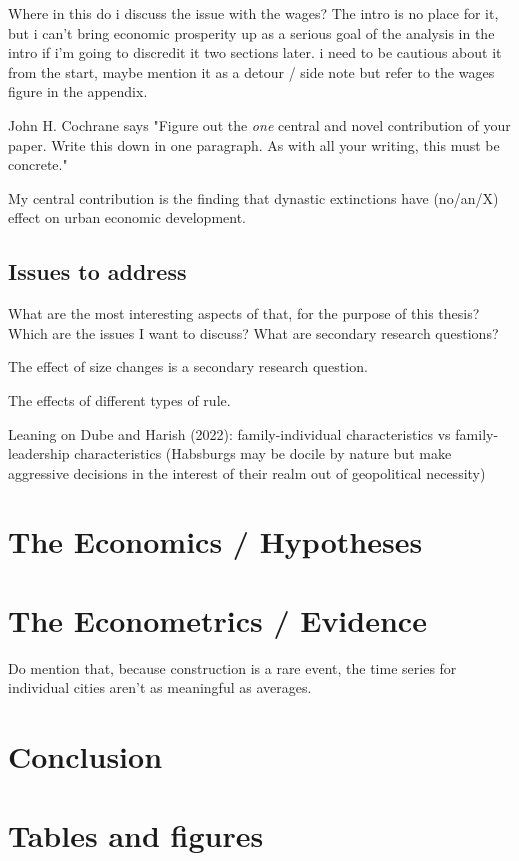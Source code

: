 \documentclass{article}
\begin{document}
Where in this do i discuss the issue with the wages? The intro is no place for it, but i can't bring economic prosperity up as a serious goal of the analysis in the intro if i'm going to discredit it two sections later. i need to be cautious about it from the start, maybe mention it as a detour / side note but refer to the wages figure in the appendix.

John H. Cochrane says "Figure out the \textit{one} central and novel contribution of your paper. Write this down in one paragraph. As with all your writing, this must be concrete."

My central contribution is the finding that dynastic extinctions have (no/an/X) effect on urban economic development.


\subsection{Issues to address}

What are the most interesting aspects of that, for the purpose of this thesis? Which are the issues I want to discuss? What are secondary research questions?

The effect of size changes is a secondary research question.

The effects of different types of rule.

Leaning on Dube and Harish (2022): family-individual characteristics vs family-leadership characteristics (Habsburgs may be docile by nature but make aggressive decisions in the interest of their realm out of geopolitical necessity)




\section{The Economics / Hypotheses}



\section{The Econometrics / Evidence}

Do mention that, because construction is a rare event, the time series for individual cities aren't as meaningful as averages.


\section{Conclusion}





\newpage
\onehalfspacing



\newpage
\section*{Tables and figures}
\end{document}
